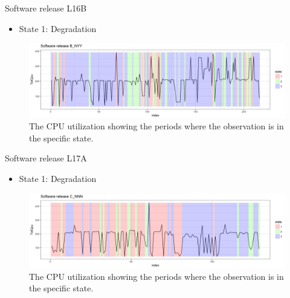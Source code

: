 \documentclass{beamer}
\begin{document}
\begin{frame}
Software release L16B

\begin{itemize}
	\item State 1: Degradation
\end{itemize}

\begin{figure}
	\includegraphics[width=1\linewidth]{L16B_NYY1}
	\caption{The CPU utilization showing the periods where the observation is in the specific state.}
\end{figure}

\end{frame}

\begin{frame}
Software release L17A

\begin{itemize}
	\item State 1: Degradation
\end{itemize}

\begin{figure}
	\includegraphics[width=1\linewidth]{L17A_NNN1}
	\caption{The CPU utilization showing the periods where the observation is in the specific state.}
\end{figure}

\end{frame}
\end{document}
